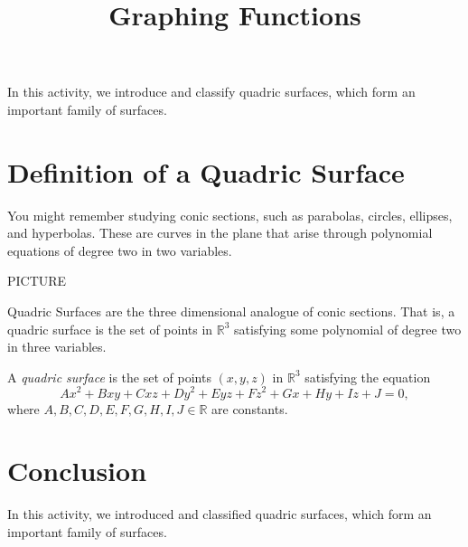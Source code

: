 \documentclass{ximera}
\title{Graphing Functions}
\begin{document}
\begin{abstract}
\end{abstract}
\maketitle


In this activity, we introduce and classify quadric surfaces, which form an important family of surfaces.

\section{Definition of a Quadric Surface}

You might remember studying conic sections, such as parabolas, circles, ellipses, and hyperbolas. These are curves in the plane that arise through polynomial equations of degree two in two variables.

PICTURE

Quadric Surfaces are the three dimensional analogue of conic sections. That is, a quadric surface is the set of points in $\mathbb{R}^3$ satisfying some polynomial of degree two in three variables.

\begin{definition}
A \emph{quadric surface} is the set of points $(x,y,z)$ in $\mathbb{R}^3$ satisfying the equation
\[
Ax^2 + Bxy + Cxz + Dy^2 + Eyz + Fz^2 +Gx + Hy + Iz + J = 0,
\]
where $A,B,C,D,E,F,G,H,I,J\in\mathbb{R}$ are constants.
\end{definition}


\section{Conclusion}

In this activity, we introduced and classified quadric surfaces, which form an important family of surfaces.
\end{document}
